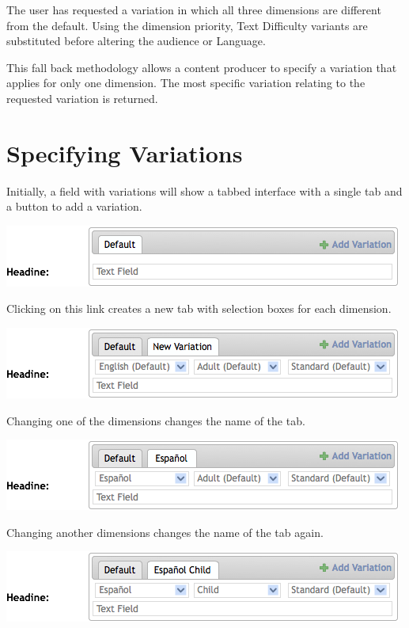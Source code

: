 \documentclass[letterpaper,10pt,english]{sphinxmanual}
\begin{document}
The user has requested a variation in which all three dimensions are different from the default. Using the dimension priority, Text Difficulty variants are substituted before altering the audience or Language.

This fall back methodology allows a content producer to specify a variation that applies for only one dimension. The most specific variation relating to the requested variation is returned.


\section{Specifying Variations}
\label{getting_started:specifying-variations}
Initially, a field with variations will show a tabbed interface with a single tab and a button to add a variation.

\includegraphics{variations-admin-interface-initial.png}

Clicking on this link creates a new tab with selection boxes for each dimension.

\includegraphics{variations-admin-interface-add-var.png}

Changing one of the dimensions changes the name of the tab.

\includegraphics{variations-admin-interface-add-change1.png}

Changing another dimensions changes the name of the tab again.

\includegraphics{variations-admin-interface-add-change2.png}
\end{document}
